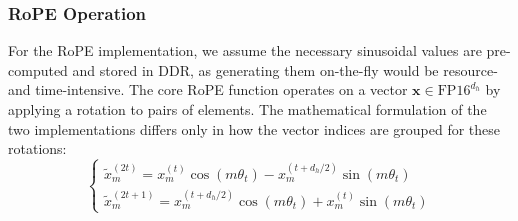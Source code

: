\documentclass[sigconf]{acmart}
\begin{document}


\subsubsection{RoPE Operation} 
For the RoPE implementation, we assume the necessary sinusoidal values are pre-computed and stored in DDR, as generating them on-the-fly would be resource- and time-intensive. The core RoPE function operates on a vector \( \mathbf{x} \in \text{FP16}^{d_h} \) by applying a rotation to pairs of elements. The mathematical formulation of the two implementations differs only in how the vector indices are grouped for these rotations:
\begin{equation}
\begin{cases}
\tilde{x}_m^{(2t)} = x_m^{(t)} \cos(m\theta_t) - x_m^{(t + d_h/2)} \sin(m\theta_t) \\
\tilde{x}_m^{(2t+1)} = x_m^{(t + d_h/2)} \cos(m\theta_t) + x_m^{(t)} \sin(m\theta_t)

\end{cases}\label{eq:half}
\end{equation}
\end{document}
